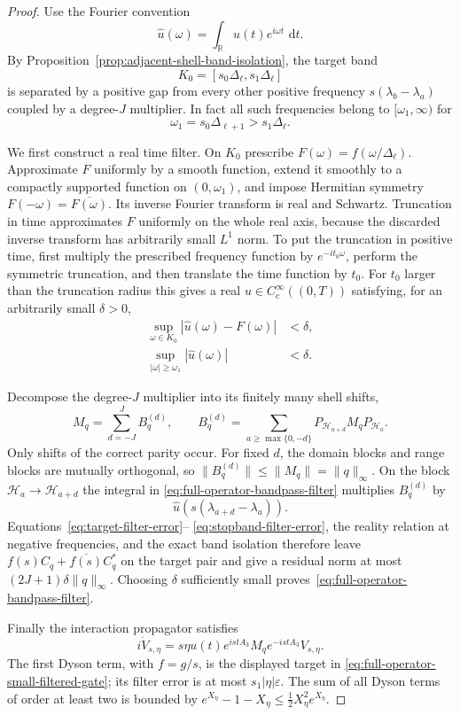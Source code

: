 \documentclass[11pt]{article}
\theoremstyle{remark}
\newcommand{\dd}{\,\mathrm d}
\begin{document}
\begin{proof}
Use the Fourier convention
\[
 \widehat u(\omega)=\int_{\mathbb R}u(t)e^{i\omega t}\,\dd t.
\]
By Proposition~\ref{prop:adjacent-shell-band-isolation}, the target band
\[
 K_0=[s_0\Delta_\ell,s_1\Delta_\ell]
\]
is separated by a positive gap from every other positive frequency
$s(\lambda_b-\lambda_a)$ coupled by a degree-$J$ multiplier.  In fact all
such frequencies belong to $[\omega_1,\infty)$ for
\[
 \omega_1=s_0\Delta_{\ell+1}>s_1\Delta_\ell.
\]

We first construct a real time filter.  On $K_0$ prescribe
$F(\omega)=f(\omega/\Delta_\ell)$.  Approximate $F$ uniformly by a smooth
function, extend it smoothly to a compactly supported function on
$(0,\omega_1)$, and impose Hermitian symmetry
$F(-\omega)=\overline{F(\omega)}$.  Its inverse Fourier transform is real and
Schwartz.  Truncation in time approximates $F$ uniformly on the whole real
axis, because the discarded inverse transform has arbitrarily small
$L^1$ norm.  To put the truncation in positive time, first multiply the
prescribed frequency function by $e^{-it_0\omega}$, perform the symmetric
truncation, and then translate the time function by $t_0$.  For $t_0$ larger
than the truncation radius this gives a real
$u\in C_c^\infty((0,T))$ satisfying, for an arbitrarily small $\delta>0$,
\begin{align}
 \sup_{\omega\in K_0}|\widehat u(\omega)-F(\omega)|&<\delta,
 \label{eq:target-filter-error}\\
 \sup_{|\omega|\geq\omega_1}|\widehat u(\omega)|&<\delta.
 \label{eq:stopband-filter-error}
\end{align}

Decompose the degree-$J$ multiplier into its finitely many shell shifts,
\[
 M_q=\sum_{d=-J}^{J}B_q^{(d)},\qquad
 B_q^{(d)}=\sum_{a\geq\max\{0,-d\}}
 P_{\mathcal H_{a+d}}M_qP_{\mathcal H_a}.
\]
Only shifts of the correct parity occur.  For fixed $d$, the domain blocks
and range blocks are mutually orthogonal, so
$\|B_q^{(d)}\|\leq\|M_q\|=\|q\|_\infty$.  On the block
$\mathcal H_a\to\mathcal H_{a+d}$ the integral in
\eqref{eq:full-operator-bandpass-filter} multiplies $B_q^{(d)}$ by
\[
 \widehat u\!\left(s(\lambda_{a+d}-\lambda_a)\right).
\]
Equations~\eqref{eq:target-filter-error}--%
\eqref{eq:stopband-filter-error}, the reality relation at negative
frequencies, and the exact band isolation therefore leave
$f(s)C_q+\overline{f(s)}C_q^\ast$ on the target pair and give a residual norm
at most $(2J+1)\delta\|q\|_\infty$.  Choosing $\delta$ sufficiently small
proves~\eqref{eq:full-operator-bandpass-filter}.

Finally the interaction propagator satisfies
\[
 i\dot V_{s,\eta}
 =s\eta u(t)e^{istA_3}M_qe^{-istA_3}V_{s,\eta}.
\]
The first Dyson term, with $f=g/s$, is the displayed target in
\eqref{eq:full-operator-small-filtered-gate}; its filter error is at most
$s_1|\eta|\varepsilon$.  The sum of all Dyson terms of order at least two is
bounded by $e^{X_\eta}-1-X_\eta\leq\tfrac12X_\eta^2e^{X_\eta}$.
\end{proof}
\end{document}
